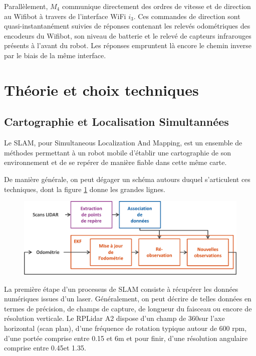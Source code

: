 Parallèlement, $M_{4}$ communique directement des ordres de vitesse et de direction au Wifibot à travers de l'interface WiFi $i_{3}$. 
Ces commandes de direction sont quasi-instantanément suivies de réponses contenant les relevés odométriques des encodeurs du Wifibot, son niveau de batterie et le relevé de capteurs infrarouges présents 
à l'avant du robot. Les réponses empruntent là encore le chemin inverse par le biais de la même interface. 

\section{Théorie et choix techniques}

  \subsection{Cartographie et Localisation Simultannées}
  
Le SLAM, pour Simultaneous Localization And Mapping, est un ensemble de méthodes permettant à un robot mobile d'établir une cartographie de son environnement et de se repérer de manière fiable dans cette même carte. 
 
De manière générale, on peut dégager un schéma autours duquel s'articulent ces techniques, dont la figure \ref{fig:slam-proc} donne les grandes lignes.

\begin{figure}[h]
  \centering
    \includegraphics[width=.8\linewidth]{figures/slam-proc-h}  
  \label{fig:slam-proc}
\end{figure}

La première étape d'un processus de SLAM consiste à récupérer les données numériques issues d'un laser. 
Généralement, on peut décrire de telles données en termes de précision, de champs de capture, de longueur du faisceau ou encore de résolution verticale. 
Le RPLidar A2 dispose d'un champ de 360\degre sur l'axe horizontal (scan plan), d'une fréquence de rotation typique autour de 600 rpm, d'une portée comprise entre 0.15 et 6m et pour finir, d'une résolution angulaire comprise entre 
0.45\degre et 1.35\degre.

